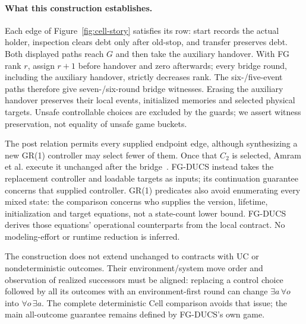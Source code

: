 \paragraph{What this construction establishes.}
Each edge of Figure~\ref{fig:cell-story} satisfies its row: start records the actual holder, inspection clears debt only after old-stop, and transfer preserves debt. Both displayed paths reach $G$ and then take the auxiliary handover. With FG rank $r$, assign $r+1$ before handover and zero afterwards; every bridge round, including the auxiliary handover, strictly decreases rank. The six-/five-event paths therefore give seven-/six-round bridge witnesses. Erasing the auxiliary handover preserves their local events, initialized memories and selected physical targets. Unsafe controllable choices are excluded by the guards; we assert witness preservation, not equality of unsafe game buckets.

The post relation permits every supplied endpoint edge, although synthesizing a new GR(1) controller may select fewer of them. Once that $C_2$ is selected, Amram et al. execute it unchanged after the bridge~\cite[Sec.~4.2, Alg.~2]{Amram2022GR1DynamicUpdate}. FG-DUCS instead takes the replacement controller and loadable targets as inputs; its continuation guarantee concerns that supplied controller. GR(1) predicates also avoid enumerating every mixed state: the comparison concerns who supplies the version, lifetime, initialization and target equations, not a state-count lower bound. FG-DUCS derives those equations' operational counterparts from the local contract. No modeling-effort or runtime reduction is inferred.

The construction does not extend unchanged to contracts with UC or nondeterministic outcomes. Their environment/system move order and observation of realized successors must be aligned: replacing a control choice followed by all its outcomes with an environment-first round can change $\exists a\,\forall o$ into $\forall o\,\exists a$. The complete deterministic Cell comparison avoids that issue; the main all-outcome guarantee remains defined by FG-DUCS's own game.
